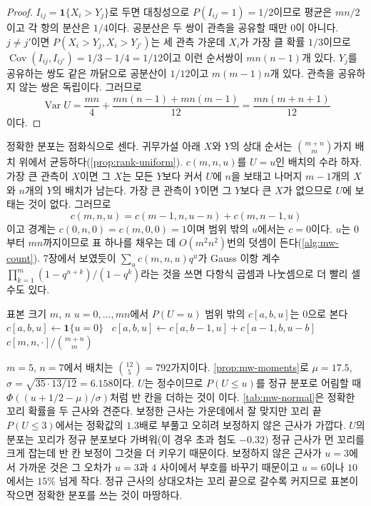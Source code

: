 \begin{proof}
$I_{ij}=\mathbf 1\{X_i>Y_j\}$로 두면 대칭성으로 $P(I_{ij}=1)=1/2$이므로 평균은 $mn/2$이고 각 항의 분산은 $1/4$이다. 공분산은 두 쌍이 관측을 공유할 때만 $0$이 아니다. $j\ne j'$이면 $P(X_i>Y_j,X_i>Y_{j'})$는 세 관측 가운데 $X_i$가 가장 클 확률 $1/3$이므로 $\operatorname{Cov}(I_{ij},I_{ij'})=1/3-1/4=1/12$이고 이런 순서쌍이 $mn(n-1)$개 있다. $Y_j$를 공유하는 쌍도 같은 까닭으로 공분산이 $1/12$이고 $m(m-1)n$개 있다. 관측을 공유하지 않는 쌍은 독립이다. 그러므로
\[
\operatorname{Var}U=\frac{mn}4+\frac{mn(n-1)+mn(m-1)}{12}=\frac{mn(m+n+1)}{12}
\]
이다.
\end{proof}

정확한 분포는 점화식으로 센다. 귀무가설 아래 $X$와 $Y$의 상대 순서는 $\binom{m+n}m$가지 배치 위에서 균등하다(\cref{prop:rank-uniform}). $c(m,n,u)$를 $U=u$인 배치의 수라 하자. 가장 큰 관측이 $X$이면 그 $X$는 모든 $Y$보다 커서 $U$에 $n$을 보태고 나머지 $m-1$개의 $X$와 $n$개의 $Y$의 배치가 남는다. 가장 큰 관측이 $Y$이면 그 $Y$보다 큰 $X$가 없으므로 $U$에 보태는 것이 없다. 그러므로
\[
c(m,n,u)=c(m-1,n,u-n)+c(m,n-1,u)
\]
이고 경계는 $c(0,n,0)=c(m,0,0)=1$이며 범위 밖의 $u$에서는 $c=0$이다. $u$는 $0$부터 $mn$까지이므로 표 하나를 채우는 데 $O(m^2n^2)$번의 덧셈이 든다(\cref{alg:mw-count}). 7장에서 보였듯이 $\sum_uc(m,n,u)q^u$가 Gauss 이항 계수 $\prod_{k=1}^m(1-q^{n+k})/(1-q^k)$라는 것을 쓰면 다항식 곱셈과 나눗셈으로 더 빨리 셀 수도 있다.

\begin{algorithm}[t]
\begin{algorithmic}[1]
\Require 표본 크기 $m$, $n$
\Ensure $u=0,\dots,mn$에서 $P(U=u)$
\State 범위 밖의 $c[a,b,u]$는 $0$으로 본다
       $c[a,b,u]\gets\mathbf 1\{u=0\}$
      \Else\ $c[a,b,u]\gets c[a,b-1,u]+c[a-1,b,u-b]$
      \EndIf
    \EndFor
  \EndFor
\EndFor
\State \Return $c[m,n,\cdot]/\binom{m+n}m$
\end{algorithmic}
\caption{Mann--Whitney 통계량의 정확 분포}
\label{alg:mw-count}
\end{algorithm}

$m=5$, $n=7$에서 배치는 $\binom{12}5=792$가지이다. \cref{prop:mw-moments}로 $\mu=17.5$, $\sigma=\sqrt{35\cdot13/12}=6.158$이다. $U$는 정수이므로 $P(U\le u)$를 정규 분포로 어림할 때 $\Phi((u+1/2-\mu)/\sigma)$처럼 반 칸을 더하는 것이 이다. \cref{tab:mw-normal}은 정확한 꼬리 확률을 두 근사와 견준다. 보정한 근사는 가운데에서 잘 맞지만 꼬리 끝 $P(U\le3)$에서는 정확값의 $1.3$배로 부풀고 오히려 보정하지 않은 근사가 가깝다. $U$의 분포는 꼬리가 정규 분포보다 가벼워(이 경우 초과 첨도 $-0.32$) 정규 근사가 먼 꼬리를 크게 잡는데 반 칸 보정이 그것을 더 키우기 때문이다. 보정하지 않은 근사가 $u=3$에서 가까운 것은 그 오차가 $u=3$과 $4$ 사이에서 부호를 바꾸기 때문이고 $u=6$이나 $10$에서는 $15\%$ 넘게 작다. 정규 근사의 상대오차는 꼬리 끝으로 갈수록 커지므로 표본이 작으면 정확한 분포를 쓰는 것이 마땅하다.


